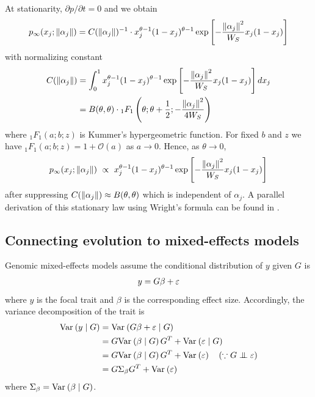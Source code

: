\documentclass[10pt]{article}
\begin{document}
At stationarity, $\partial p/\partial t=0$ and we obtain \citep{Ewens2004mathpopgen}
\begin{align} \label{eq:stat_dist}
     p_{\infty}(x_j;\left\| \alpha_j \right\|) = C(\left\| \alpha_j \right\|)^{-1} \cdot
     x_j^{\theta-1}(1-x_j)^{\theta-1} 
     \exp\left[-\frac{\left\| \alpha_j \right\|^2}{W_S}x_j(1-x_j) \right]
\end{align}
with normalizing constant 
\begin{align*} \label{eq:norm_const}
    C(\left\| \alpha_j \right\|) &= \int_0^1 x_j^{\theta-1}(1-x_j)^{\theta-1} 
    \exp\left[-\frac{\left\| \alpha_j \right\|^2}{W_S}x_j(1-x_j) \right] dx_j \\
    &= B(\theta, \theta) 
    \cdot {_1F_1} \left(
    \theta; \theta + \frac{1}{2}; -\frac{\left\| \alpha_j \right\|^2}{4W_S}
    \right)
\end{align*}
where $_1F_1(a;b;z)$ is Kummer's hypergeometric function.
For fixed $b$ and $z$ we have $_1F_1(a;b;z) = 1 + \mathcal{O}(a)$ as $a\to 0$. Hence, as $\theta \to 0$,
\begin{align}
    p_{\infty}(x_j ; \left\| \alpha_j \right\|) \ \propto \
    x_j^{\theta-1}(1-x_j)^{\theta-1}
    \exp\left[-\frac{\left\| \alpha_j \right\|^2}{W_S}x_j(1-x_j) \right]
\end{align}
after suppressing $C(\left\| \alpha_j \right\|) \approx B(\theta, \theta)$ which is independent of $\alpha_j$.
A parallel derivation of this stationary law using Wright's formula \citep{Wright1937, walsh2018evolutionandselectionof} can be found in \citet[][eqn.~26]{Bulmer1972}.


\subsection{Connecting evolution to mixed-effects models}
Genomic mixed-effects models assume the conditional distribution of $y$ given $G$ is 
\begin{align}
    y = G\beta + {{\varepsilon}} 
\end{align}
where $y$ is the focal trait and $\beta$ is the corresponding effect size.
Accordingly, the variance decomposition of the trait is
\begin{align}
    \begin{aligned}
    \var{y \mid G} &= \var{G\beta + \veps \mid G} \\
    &= G\var{\beta \mid G}G^T + \var{\veps \mid G} \\
    &= G\var{\beta \mid G}G^T + \var{\veps} 
    \quad
    (\because G \indep \veps) \\
    &= G \Sigma_\beta G^T + \var{\veps}
    \end{aligned}
\end{align}
where $\Sigma_\beta = \mathrm{Var}_{}\left(\beta \mid G\right)$.
\end{document}
